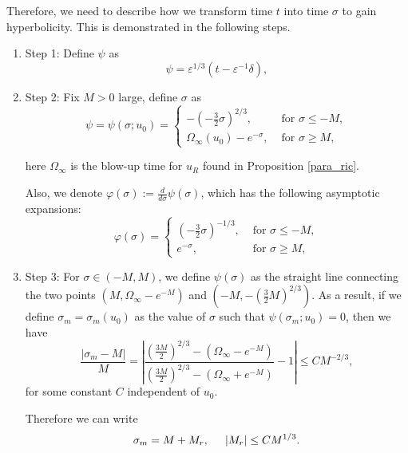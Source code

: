 \documentclass[letterpaper,11pt]{article}
\newcommand{\eps}{\varepsilon}
\numberwithin{equation}{section}
\theoremstyle{plain}
\begin{document}
Therefore, we need to describe how we transform time $t$ into time $\sigma$ to gain hyperbolicity. This is demonstrated in the following steps.
\begin{enumerate}
\item Step 1: Define $\psi$ as
\[
\psi = \eps^{1/3}(t - \eps^{-1}\delta),
\]

\item Step 2:
Fix $M>0$ large, define $\sigma$ as
\begin{equation} \label{psi_def}
\psi = \psi(\sigma; u_0) =\begin{cases}
-(-\frac{3}{2} \sigma)^{2/3} , &\text{ for }\sigma \le -M, \\
\Omega_\infty(u_0) -e^{-\sigma}, &\text{ for }\sigma \ge M,
\end{cases}
\end{equation}

here $\Omega_\infty$ is the blow-up time for $u_R$ found in Proposition \ref{para_ric}.

Also, we denote $\varphi(\sigma) := \frac{d}{d\sigma}\psi(\sigma)$, which has the following asymptotic expansions: 
\begin{equation} \label{phi_def}
\varphi(\sigma)  =\begin{cases}
(-\frac{3}{2} \sigma)^{-1/3} , &\text{ for }\sigma \le -M, \\
e^{-\sigma}, &\text{ for }\sigma \ge M,
\end{cases}
\end{equation}
\item Step 3: For $\sigma \in (-M, M)$, we define $\psi(\sigma)$ as the straight line connecting the two points $(M, \Omega_\infty-e^{-M})$ and $(-M, -(\frac{3}{2}M)^{2/3})$. As a result, if we define $\sigma_m=\sigma_m(u_0)$ as the value of $\sigma$ such that $\psi(\sigma_m; u_0) = 0$, then we have 
\[
\frac{|\sigma_m - M|}{M} = \left| \frac{(\frac{3M}{2})^{2/3}-(\Omega_\infty-e^{-M})}{(\frac{3M}{2})^{2/3}-(\Omega_\infty+e^{-M})} -1 \right|\le CM^{-2/3},
\] 
for some constant $C$ independent of $u_0$.

Therefore we can write
\begin{equation}\label{sigm_asy}
\sigma_m = M + M_r, \hspace{0.2in} |M_r| \le CM^{1/3}.
\end{equation}
\end{enumerate}
\end{document}
